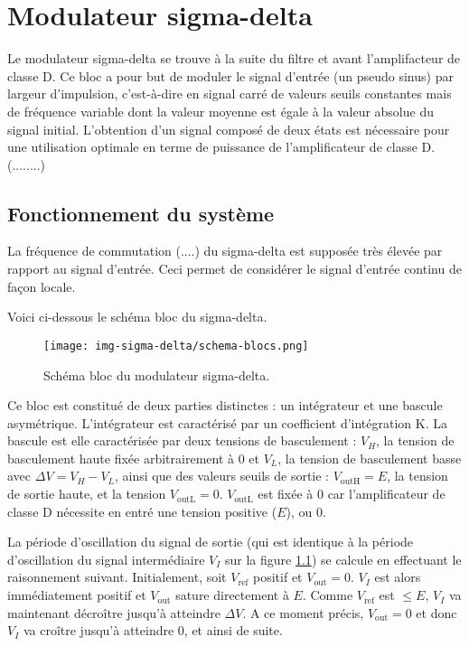 \chapter{Modulateur sigma-delta}
Le modulateur sigma-delta se trouve à la suite du filtre et avant l'amplifacteur de classe D. Ce bloc a pour but de moduler le signal d'entrée (un pseudo sinus) par largeur d'impulsion, c'est-à-dire en signal carré de valeurs seuils constantes mais de fréquence variable dont la valeur moyenne est égale à la valeur absolue du signal initial. L'obtention d'un signal composé de deux états est nécessaire pour une utilisation optimale en terme de puissance de l'amplificateur de classe D. (........)


\section{Fonctionnement du système}

La fréquence de commutation (....) du sigma-delta est supposée très élevée par rapport au signal d'entrée. Ceci permet de considérer le signal d'entrée continu de façon locale.


Voici ci-dessous le schéma bloc du sigma-delta.

\begin{figure}[ht]
	\centering
	\texttt{[image: img-sigma-delta/schema-blocs.png]}
	\caption{Schéma bloc du modulateur sigma-delta.}
	\label{fig:sigma-delta-schema-blocs}
\end{figure}

Ce bloc est constitué de deux parties distinctes : un intégrateur et une bascule asymétrique.
L'intégrateur est caractérisé par un coefficient d'intégration K. La bascule est elle caractérisée par deux tensions de basculement : $V_H$, la tension de basculement haute  fixée arbitrairement à 0 et $V_L$, la tension de basculement basse avec $\Delta V = V_H - V_L$, ainsi que des valeurs seuils de sortie : $V_{\text{outH}} = E$, la tension de sortie haute, et la tension $V_{\text{outL}} = 0$. $V_{\text{outL}}$ est fixée à 0 car l'amplificateur de classe D nécessite en entré une tension positive ($E$), ou 0.

La période d'oscillation du signal de sortie (qui est 
identique à la période d'oscillation du signal intermédiaire
$V_I$ sur la figure \ref{fig:sigma-delta-schema-blocs})
se calcule en effectuant le raisonnement suivant.
Initialement, soit $V_{\text{ref}}$ positif et
$V_{\text{out}} = 0$. $V_I$ est alors immédiatement positif
et $V_{\text{out}}$ sature directement à $E$. Comme $V_{\text{ref}}$
est $\leq E$, $V_I$ va maintenant décroître jusqu'à atteindre
$\Delta V$. A ce moment précis, $V_{\text{out}} = 0$
et donc $V_I$ va croître jusqu'à atteindre 0, et ainsi de suite.

